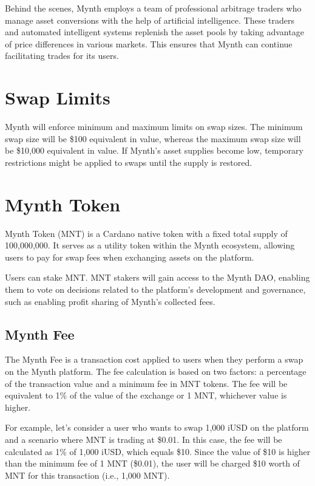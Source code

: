 Behind the scenes, Mynth employs a team of professional arbitrage
traders who manage asset conversions with the help of artificial
intelligence. These traders and automated intelligent systems replenish
the asset pools by taking advantage of price differences in various
markets. This ensures that Mynth can continue facilitating trades for
its users.

\hypertarget{swap-limits}{%
\section{Swap Limits}\label{swap-limits}}

Mynth will enforce minimum and maximum limits on swap sizes. The minimum
swap size will be \$100 equivalent in value, whereas the maximum swap
size will be \$10,000 equivalent in value. If Mynth's asset supplies
become low, temporary restrictions might be applied to swaps until the
supply is restored.

\hypertarget{mynth-token}{%
\section{Mynth Token}\label{mynth-token}}

Mynth Token (MNT) is a Cardano native token with a fixed total supply of
100,000,000. It serves as a utility token within the Mynth ecosystem,
allowing users to pay for swap fees when exchanging assets on the
platform.

Users can stake MNT. MNT stakers will gain access to the Mynth DAO,
enabling them to vote on decisions related to the platform's development
and governance, such as enabling profit sharing of Mynth's collected
fees.

\hypertarget{mynth-fee}{%
\subsection{Mynth Fee}\label{mynth-fee}}

The Mynth Fee is a transaction cost applied to users when they perform a
swap on the Mynth platform. The fee calculation is based on two factors:
a percentage of the transaction value and a minimum fee in MNT tokens.
The fee will be equivalent to 1\% of the value of the exchange or 1 MNT,
whichever value is higher.

For example, let's consider a user who wants to swap 1,000 iUSD on the
platform and a scenario where MNT is trading at \$0.01. In this case,
the fee will be calculated as 1\% of 1,000 iUSD, which equals \$10.
Since the value of \$10 is higher than the minimum fee of 1 MNT
(\$0.01), the user will be charged \$10 worth of MNT for this
transaction (i.e., 1,000 MNT).

